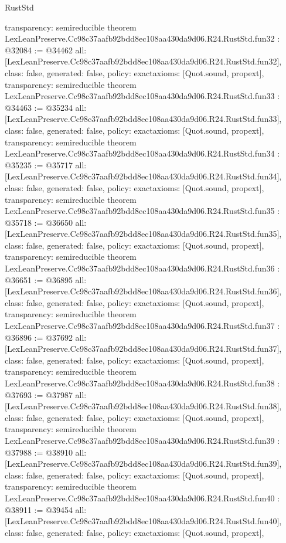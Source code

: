 \begin{lexlean}{RustStd}
\begin{coremodule}
{  transparency: semireducible
}
theorem LexLeanPreserve.Cc98c37aafb92bdd8ec108aa430da9d06.R24.RustStd.fun32 : @32084 := @34462 {
  all: [LexLeanPreserve.Cc98c37aafb92bdd8ec108aa430da9d06.R24.RustStd.fun32],
  class: false,
  generated: false,
  policy: exact{axioms: [Quot.sound, propext]},
  transparency: semireducible
}
theorem LexLeanPreserve.Cc98c37aafb92bdd8ec108aa430da9d06.R24.RustStd.fun33 : @34463 := @35234 {
  all: [LexLeanPreserve.Cc98c37aafb92bdd8ec108aa430da9d06.R24.RustStd.fun33],
  class: false,
  generated: false,
  policy: exact{axioms: [Quot.sound, propext]},
  transparency: semireducible
}
theorem LexLeanPreserve.Cc98c37aafb92bdd8ec108aa430da9d06.R24.RustStd.fun34 : @35235 := @35717 {
  all: [LexLeanPreserve.Cc98c37aafb92bdd8ec108aa430da9d06.R24.RustStd.fun34],
  class: false,
  generated: false,
  policy: exact{axioms: [Quot.sound, propext]},
  transparency: semireducible
}
theorem LexLeanPreserve.Cc98c37aafb92bdd8ec108aa430da9d06.R24.RustStd.fun35 : @35718 := @36650 {
  all: [LexLeanPreserve.Cc98c37aafb92bdd8ec108aa430da9d06.R24.RustStd.fun35],
  class: false,
  generated: false,
  policy: exact{axioms: [Quot.sound, propext]},
  transparency: semireducible
}
theorem LexLeanPreserve.Cc98c37aafb92bdd8ec108aa430da9d06.R24.RustStd.fun36 : @36651 := @36895 {
  all: [LexLeanPreserve.Cc98c37aafb92bdd8ec108aa430da9d06.R24.RustStd.fun36],
  class: false,
  generated: false,
  policy: exact{axioms: [Quot.sound, propext]},
  transparency: semireducible
}
theorem LexLeanPreserve.Cc98c37aafb92bdd8ec108aa430da9d06.R24.RustStd.fun37 : @36896 := @37692 {
  all: [LexLeanPreserve.Cc98c37aafb92bdd8ec108aa430da9d06.R24.RustStd.fun37],
  class: false,
  generated: false,
  policy: exact{axioms: [Quot.sound, propext]},
  transparency: semireducible
}
theorem LexLeanPreserve.Cc98c37aafb92bdd8ec108aa430da9d06.R24.RustStd.fun38 : @37693 := @37987 {
  all: [LexLeanPreserve.Cc98c37aafb92bdd8ec108aa430da9d06.R24.RustStd.fun38],
  class: false,
  generated: false,
  policy: exact{axioms: [Quot.sound, propext]},
  transparency: semireducible
}
theorem LexLeanPreserve.Cc98c37aafb92bdd8ec108aa430da9d06.R24.RustStd.fun39 : @37988 := @38910 {
  all: [LexLeanPreserve.Cc98c37aafb92bdd8ec108aa430da9d06.R24.RustStd.fun39],
  class: false,
  generated: false,
  policy: exact{axioms: [Quot.sound, propext]},
  transparency: semireducible
}
theorem LexLeanPreserve.Cc98c37aafb92bdd8ec108aa430da9d06.R24.RustStd.fun40 : @38911 := @39454 {
  all: [LexLeanPreserve.Cc98c37aafb92bdd8ec108aa430da9d06.R24.RustStd.fun40],
  class: false,
  generated: false,
  policy: exact{axioms: [Quot.sound, propext]},
}
\end{coremodule}
\end{lexlean}
